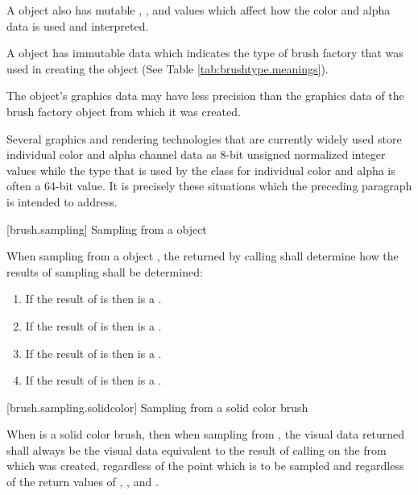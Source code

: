 \pnum
A  object also has mutable , , and  values which affect how the color and alpha data is used and interpreted.

\pnum
A  object has immutable  data which indicates the type of brush factory that was used in creating the  object (See Table \ref{tab:brushtype.meanings}).

\pnum
The  object's graphics data may have less precision than the graphics data of the brush factory object from which it was created.

\pnum
\enterexample
Several graphics and rendering technologies that are currently widely used store individual color and alpha channel data as 8-bit unsigned normalized integer values while the  type that is used by the  class for individual color and alpha is often a 64-bit value. It is precisely these situations which the preceding paragraph is intended to address.
\exitexample

 [brush.sampling] {Sampling from a  object}

\pnum
When sampling from a  object , the  returned by calling  shall determine how the results of sampling shall be determined:
\begin{enumerate}
\item If the result of  is  then  is a .
\item If the result of  is  then  is a .
\item If the result of  is  then  is a .
\item If the result of  is  then  is a .
\end{enumerate}

 [brush.sampling.solidcolor] {Sampling from a solid color brush}

\pnum
When  is a solid color brush, then when sampling from , the visual data returned shall always be the visual data equivalent to the result of calling  on the  from which  was created, regardless of the point which is to be sampled and regardless of the return values of , , and .

